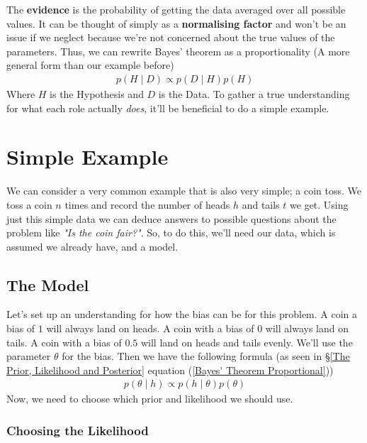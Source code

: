 \documentclass[11pt]{article}   %
\begin{document}
The \textbf{evidence} is the probability of getting the data averaged over all possible values. It can be thought of simply as a \textbf{normalising factor} and won't be an issue if we neglect because we're not concerned about the true values of the parameters. Thus, we can rewrite Bayes' theorem as a proportionality (A more general form than our example before)
\begin{align}\label{Bayes' Theorem Proportional}
p(H\mid D) \propto p(D\mid H)p(H)
\end{align}
Where $H$ is the Hypothesis and $D$ is the Data. To gather a true understanding for what each role actually \textit{does}, it'll be beneficial to do a simple example.

\section{Simple Example}\label{Simple Example}

We can consider a very common example that is also very simple; a coin toss. We toss a coin $n$ times and record the number of heads $h$ and tails $t$ we get. Using just this simple data we can deduce answers to possible questions about the problem like \textit{"Is the coin fair?"}. So, to do this, we'll need our data, which is assumed we already have, and a model. 

\subsection{The Model}\label{The Model}

Let's set up an understanding for how the bias can be for this problem. A coin a bias of $1$ will always land on heads. A coin with a bias of $0$ will always land on tails. A coin with a bias of $0.5$ will land on heads and tails evenly. We'll use the parameter $\theta$ for the bias. Then we have the following formula (as seen in \S\ref{The Prior, Likelihood and Posterior} equation (\ref{Bayes' Theorem Proportional}))
\begin{align}\label{Bayes' Theorem Proportional Coin}
p(\theta\mid h) \propto p(h\mid \theta)p(\theta)
\end{align}
Now, we need to choose which prior and likelihood we should use.

\subsubsection{Choosing the Likelihood}\label{Choosing the Likelihood}
\end{document}
